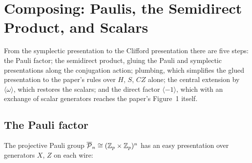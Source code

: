 \section{Composing: Paulis, the Semidirect Product, and Scalars}\label{sec:composing}

From the symplectic presentation to the Clifford presentation there are
five steps: the Pauli factor; the semidirect product, gluing the Pauli
and symplectic presentations along the conjugation action; plumbing,
which simplifies the glued presentation to the paper's rules over $H$,
$S$, $CZ$ alone; the central extension by $\langle\omega\rangle$,
which restores the scalars; and the direct factor $\langle -1\rangle$,
which with an exchange of scalar generators reaches the paper's
Figure~1 itself.

\subsection{The Pauli factor}\label{sec:pauli}

The projective Pauli group $\overline{\mathcal{P}}_{n} \cong (\mathbb{Z}_p \times \mathbb{Z}_p)^n$ has an easy
presentation over generators $X$, $Z$ on each wire:

